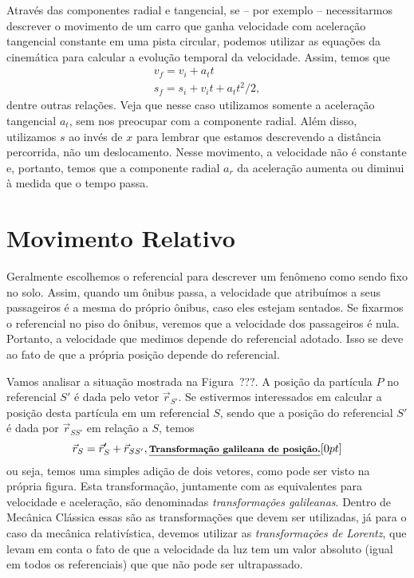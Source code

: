 Através das componentes radial e tangencial, se -- por exemplo -- necessitarmos descrever o movimento de um carro que ganha velocidade com aceleração tangencial constante em uma pista circular, podemos utilizar as equações da cinemática para calcular a evolução temporal da velocidade. Assim, temos que
\begin{align}
  v_f = v_i + a_t t \\
  s_f = s_i + v_i t + a_t t^2/2,
\end{align}
%
dentre outras relações. Veja que nesse caso utilizamos somente a aceleração tangencial $a_t$, sem nos preocupar com a componente radial. Além disso, utilizamos $s$ ao invés de $x$ para lembrar que estamos descrevendo a distância percorrida, não um deslocamento. Nesse movimento, a velocidade não é constante e, portanto, temos que a componente radial $a_r$ da aceleração aumenta ou diminui à medida que o tempo passa.

\section{Movimento Relativo}

Geralmente escolhemos o referencial para descrever um fenômeno como sendo fixo no solo. Assim, quando um ônibus passa, a velocidade que atribuímos a seus passageiros é a mesma do próprio ônibus, caso eles estejam sentados. Se fixarmos o referencial no piso do ônibus, veremos que a velocidade dos passageiros é nula. Portanto, a velocidade que medimos depende do referencial adotado. Isso se deve ao fato de que a própria posição depende do referencial.

Vamos analisar a situação mostrada na Figura~???. A posição da partícula $P$ no referencial $S'$ é dada pelo vetor $\vec{r}_{S'}$. Se estivermos interessados em calcular a posição desta partícula em um referencial $S$, sendo que a posição do referencial $S'$ é dada por $\vec{r}_{SS'}$ em relação a $S$, temos
\begin{equation}
  \vec{r}_S = \vec{r}_S' + \vec{r}_{SS'},\relax{\footnotesize\emph{\textbf{Transformação galileana de posição.}}}[0pt]
\end{equation}
%
ou seja, temos uma simples adição de dois vetores, como pode ser visto na própria figura. Esta transformação, juntamente com as equivalentes para velocidade e aceleração, são denominadas \emph{transformações galileanas}. Dentro de Mecânica Clássica essas são as transformações que devem ser utilizadas, já para o caso da mecânica relativística, devemos utilizar as \emph{transformações de Lorentz}, que levam em conta o fato de que a velocidade da luz tem um valor absoluto (igual em todos os referenciais) que que não pode ser ultrapassado.

